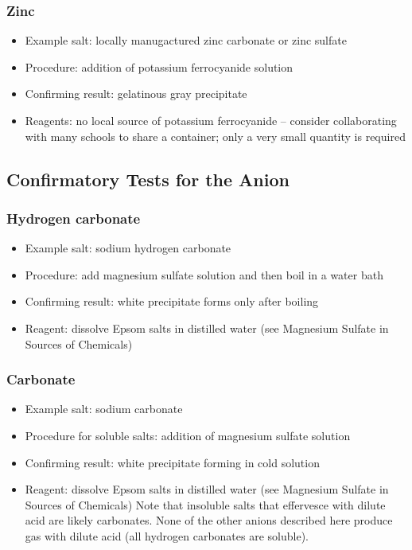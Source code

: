 \subsubsection{Zinc}
\begin{itemize}
\item{Example salt: locally manugactured zinc carbonate 
or zinc sulfate}
\item{Procedure: addition of potassium ferrocyanide solution}
\item{Confirming result: gelatinous gray precipitate}
\item{Reagents: no local source of potassium ferrocyanide – 
consider collaborating with many schools to share a container; 
only a very small quantity is required}
\end{itemize}

\subsection{Confirmatory Tests for the Anion} 

\subsubsection{Hydrogen carbonate}
\begin{itemize}
\item{Example salt: sodium hydrogen carbonate}
\item{Procedure: add magnesium sulfate solution 
and then boil in a water bath}
\item{Confirming result: white precipitate forms only after boiling}
\item{Reagent: dissolve Epsom salts in distilled water 
(see Magnesium Sulfate in Sources of Chemicals)}
\end{itemize}

\subsubsection{Carbonate}
\begin{itemize}
\item{Example salt: sodium carbonate}
\item{Procedure for soluble salts: addition of magnesium sulfate solution}
\item{Confirming result: white precipitate forming in cold solution}
\item{Reagent: dissolve Epsom salts in distilled water 
(see Magnesium Sulfate in Sources of Chemicals)}
Note that insoluble salts that effervesce 
with dilute acid are likely carbonates. 
None of the other anions described here produce gas with dilute acid 
(all hydrogen carbonates are soluble).
\end{itemize}

